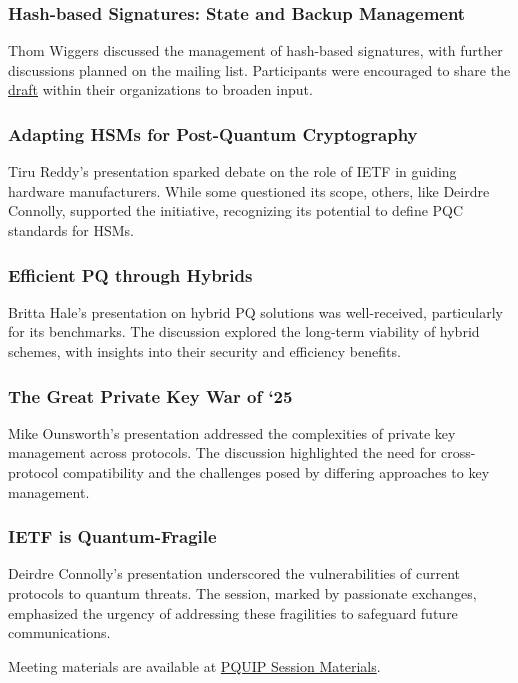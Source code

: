 \documentclass{article}
\begin{document}
\subsubsection{Hash-based Signatures: State and Backup Management}
Thom Wiggers discussed the management of hash-based signatures, with further discussions planned on the mailing list. Participants were encouraged to share the \href{https://datatracker.ietf.org/doc/draft-wiggers-hbs-state/}{draft} within their organizations to broaden input.

\subsubsection{Adapting HSMs for Post-Quantum Cryptography}
Tiru Reddy's presentation sparked debate on the role of IETF in guiding hardware manufacturers. While some questioned its scope, others, like Deirdre Connolly, supported the initiative, recognizing its potential to define PQC standards for HSMs.

\subsubsection{Efficient PQ through Hybrids}
Britta Hale's presentation on hybrid PQ solutions was well-received, particularly for its benchmarks. The discussion explored the long-term viability of hybrid schemes, with insights into their security and efficiency benefits.

\subsubsection{The Great Private Key War of ‘25}
Mike Ounsworth's presentation addressed the complexities of private key management across protocols. The discussion highlighted the need for cross-protocol compatibility and the challenges posed by differing approaches to key management.

\subsubsection{IETF is Quantum-Fragile}
Deirdre Connolly's presentation underscored the vulnerabilities of current protocols to quantum threats. The session, marked by passionate exchanges, emphasized the urgency of addressing these fragilities to safeguard future communications.

Meeting materials are available at \href{https://datatracker.ietf.org/meeting/122/session/pquip/}{PQUIP Session Materials}.
\end{document}
